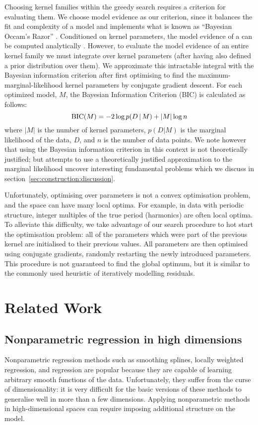 Choosing kernel families within the greedy search requires a criterion for evaluating them.
We choose model evidence as our criterion, since it balances the fit and complexity of a model and implements what is known as ``Bayesian Occam's Razor'' \citep[e.g.][]{Rasmussen2001-rv, MacKay2003-rp}.
Conditioned on kernel parameters, the model evidence of a \gp{} can be computed analytically \citep[e.g.][]{Rasmussen2006-ml}.
However, to evaluate the model evidence of an entire kernel family we must integrate over kernel parameters (after having also defined a prior distribution over them). 
We approximate this intractable integral with the Bayesian information criterion \citep{Schwarz1978-wp} after first optimising to find the maximum-marginal-likelihood kernel parameters by conjugate gradient descent.
For each optimized model, $M$, the Bayesian Information Criterion (BIC) is calculated as follows:
\begin{equation}
\textrm{BIC}(M) = -2 \log p(D\,|\, M) + |M| \log n
\end{equation}
where $|M|$ is the number of kernel parameters, $p(D|M)$ is the marginal likelihood of the data, $D$, and $n$ is the number of data points.
We note however that using the Bayesian information criterion in this context is not theoretically justified; but attempts to use a theoretically justified approximation to the marginal likelihood uncover interesting fundamental problems which we discuss in section~\ref{sec:construction:discussion}.

Unfortunately, optimising over parameters is not a convex optimisation problem, and the space can have many local optima.
For example, in data with periodic structure, integer multiples of the true period (\ie harmonics) are often local optima. 
To alleviate this difficulty, we take advantage of our search procedure to hot start the optimisation problem: all of the parameters which were part of the previous kernel are initialised to their previous values.
All parameters are then optimised using conjugate gradients, randomly restarting the newly introduced parameters.
This procedure is not guaranteed to find the global optimum, but it is similar to the commonly used heuristic of iteratively modelling residuals.

\section{Related Work}
\label{sec:construction:related_work}

\subsection{Nonparametric regression in high dimensions}
Nonparametric regression methods such as smoothing splines, locally weighted regression, and \gp{} regression are popular because they are capable of learning arbitrary smooth functions of the data.
Unfortunately, they suffer from the curse of dimensionality: it is very difficult for the basic versions of these methods to generalise well in more than a few dimensions.
Applying nonparametric methods in high-dimensional spaces can require imposing additional structure on the model.

